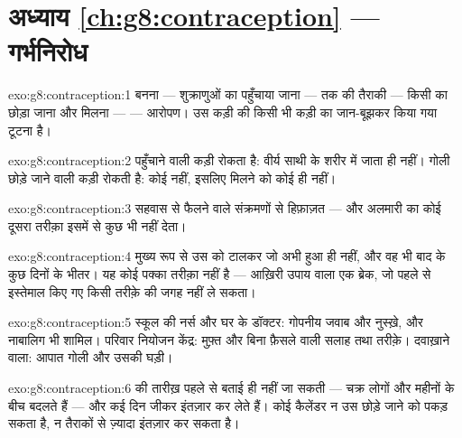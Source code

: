 \section*{अध्याय \ref{ch:g8:contraception} --- गर्भनिरोध}

\begin{solution}{exo:g8:contraception:1}
 बनना --- शुक्राणुओं का पहुँचाया जाना ---  तक की तैराकी
--- किसी  का छोड़ा जाना और मिलना ---  --- आरोपण। 
उस कड़ी की किसी भी कड़ी का जान-बूझकर किया गया टूटना है।
\end{solution}

\begin{solution}{exo:g8:contraception:2}
 पहुँचाने वाली कड़ी रोकता है: वीर्य साथी के शरीर में जाता ही नहीं।
गोली छोड़े जाने वाली कड़ी रोकती है: कोई  नहीं, इसलिए मिलने को
कोई  ही नहीं।
\end{solution}

\begin{solution}{exo:g8:contraception:3}
सहवास से फैलने वाले संक्रमणों से हिफ़ाज़त --- और अलमारी का कोई दूसरा
तरीक़ा इसमें से कुछ भी नहीं देता।
\end{solution}

\begin{solution}{exo:g8:contraception:4}
मुख्य रूप से उस  को टालकर जो अभी हुआ ही नहीं, और वह भी बाद के
कुछ दिनों के भीतर। यह कोई पक्का तरीक़ा नहीं है --- आख़िरी उपाय वाला एक
ब्रेक, जो पहले से इस्तेमाल किए गए किसी तरीक़े की जगह नहीं ले सकता।
\end{solution}

\begin{solution}{exo:g8:contraception:5}
स्कूल की नर्स और घर के डॉक्टर: गोपनीय जवाब और नुस्ख़े, और नाबालिग भी
शामिल। परिवार नियोजन केंद्र: मुफ़्त और बिना फ़ैसले वाली सलाह तथा
तरीक़े। दवाख़ाने वाला: आपात गोली और उसकी घड़ी।
\end{solution}

\begin{solution}{exo:g8:contraception:6}
 की तारीख़ पहले से बताई ही नहीं जा सकती --- चक्र लोगों और
महीनों के बीच बदलते हैं --- और  कई दिन जीकर इंतज़ार कर लेते
हैं। कोई कैलेंडर न उस छोड़े जाने को पकड़ सकता है, न तैराकों से ज़्यादा
इंतज़ार कर सकता है।
\end{solution}

